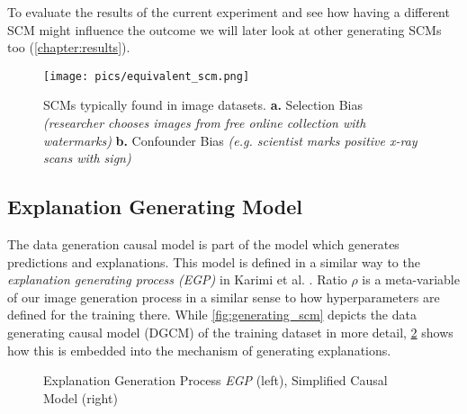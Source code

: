 To evaluate the results of the current experiment and see how having a different SCM might influence the outcome we will later look at other generating SCMs too (\cref{chapter:results}).

\begin{figure}[H]
    \centering
    \texttt{[image: pics/equivalent\_scm.png]}
    \caption{SCMs typically found in image datasets.
    \textbf{a.} Selection Bias \textit{(researcher chooses images from free online collection with watermarks)}
    \textbf{b.} Confounder Bias \textit{(e.g. scientist marks positive x-ray scans with sign)}}
    \label{fig:equivalent_scm}
\end{figure}

\subsection{Explanation Generating Model}
The data generation causal model is part of the model which generates predictions and explanations.
This model is defined in a similar way to the \textit{explanation generating process (EGP)} in Karimi et al. \cite{Karimi2023}.
Ratio $\rho$ is a meta-variable of our image generation process in a similar sense to how hyperparameters are defined for the training there. While \cref{fig:generating_scm} depicts the data generating causal model (DGCM) of the training dataset in more detail, \cref{fig:egp} shows how this is embedded into the mechanism of generating explanations. 

\begin{figure}[H]
    \centering
    \caption{Explanation Generation Process \textit{EGP} (left), Simplified Causal Model (right)}
    \label{fig:egp}
\end{figure}

